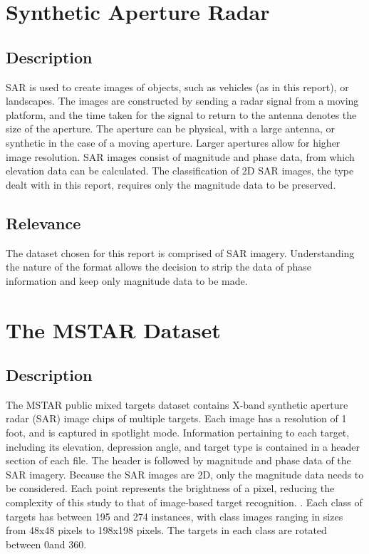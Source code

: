 \section{Synthetic Aperture Radar}
\subsection{Description}
SAR is used to create images of objects, such as vehicles (as in this report), or landscapes. The images are constructed by sending a radar signal from a moving platform, and the time taken for the signal to return to the antenna denotes the size of the aperture. The aperture can be physical, with a large antenna, or synthetic in the case of a moving aperture. Larger apertures allow for higher image resolution. SAR images consist of magnitude and phase data, from which elevation data can be calculated. The classification of 2D SAR images, the type dealt with in this report, requires only the magnitude data to be preserved.
\subsection{Relevance}
The dataset chosen for this report is comprised of SAR imagery. Understanding the nature of the format allows the decision to strip the data of phase information and keep only magnitude data to be made. 

\section{The MSTAR Dataset}
\subsection{Description}
The MSTAR public mixed targets dataset contains X-band synthetic aperture radar (SAR) image chips of multiple targets. Each image has a resolution of 1 foot, and is captured in spotlight mode. Information pertaining to each target, including its elevation, depression angle, and target type is contained in a header section of each file. The header is followed by magnitude and phase data of the SAR imagery. Because the SAR images are 2D, only the magnitude data needs to be considered. Each point represents the brightness of a pixel, reducing the complexity of this study to that of image-based target recognition. \cite{Schumacher_atrof}. Each class of targets has between 195 and 274 instances, with class images ranging in sizes from 48x48 pixels to 198x198 pixels. The targets in each class are rotated between 0\degree and 360\degree.

